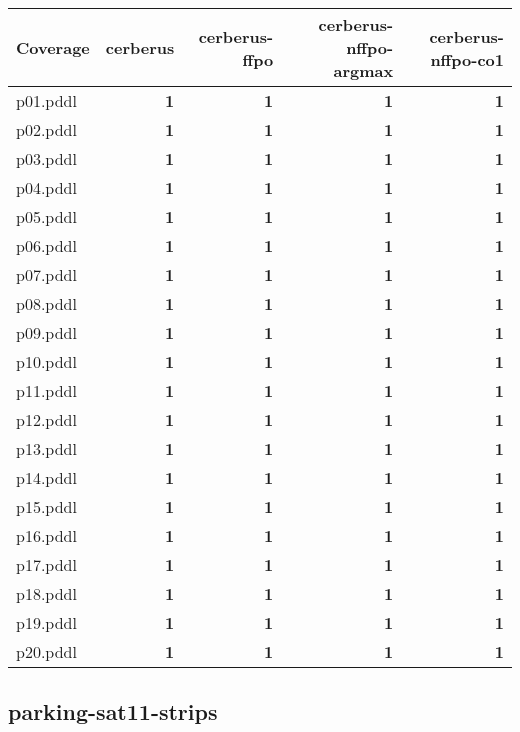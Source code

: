 \documentclass{article}
\begin{document}
\begin{tabular}{@{}lrrrr@{}}
Coverage & cerberus & cerberus-ffpo & cerberus-nffpo-argmax & cerberus-nffpo-co1 \\
\midrule
p01.pddl & \textbf{1} & \textbf{1} & \textbf{1} & \textbf{1} \\
p02.pddl & \textbf{1} & \textbf{1} & \textbf{1} & \textbf{1} \\
p03.pddl & \textbf{1} & \textbf{1} & \textbf{1} & \textbf{1} \\
p04.pddl & \textbf{1} & \textbf{1} & \textbf{1} & \textbf{1} \\
p05.pddl & \textbf{1} & \textbf{1} & \textbf{1} & \textbf{1} \\
p06.pddl & \textbf{1} & \textbf{1} & \textbf{1} & \textbf{1} \\
p07.pddl & \textbf{1} & \textbf{1} & \textbf{1} & \textbf{1} \\
p08.pddl & \textbf{1} & \textbf{1} & \textbf{1} & \textbf{1} \\
p09.pddl & \textbf{1} & \textbf{1} & \textbf{1} & \textbf{1} \\
p10.pddl & \textbf{1} & \textbf{1} & \textbf{1} & \textbf{1} \\
p11.pddl & \textbf{1} & \textbf{1} & \textbf{1} & \textbf{1} \\
p12.pddl & \textbf{1} & \textbf{1} & \textbf{1} & \textbf{1} \\
p13.pddl & \textbf{1} & \textbf{1} & \textbf{1} & \textbf{1} \\
p14.pddl & \textbf{1} & \textbf{1} & \textbf{1} & \textbf{1} \\
p15.pddl & \textbf{1} & \textbf{1} & \textbf{1} & \textbf{1} \\
p16.pddl & \textbf{1} & \textbf{1} & \textbf{1} & \textbf{1} \\
p17.pddl & \textbf{1} & \textbf{1} & \textbf{1} & \textbf{1} \\
p18.pddl & \textbf{1} & \textbf{1} & \textbf{1} & \textbf{1} \\
p19.pddl & \textbf{1} & \textbf{1} & \textbf{1} & \textbf{1} \\
p20.pddl & \textbf{1} & \textbf{1} & \textbf{1} & \textbf{1} \\
\end{tabular}

\hypertarget{coverage-parking-sat11-strips}{}
\subsection*{parking-sat11-strips}
\end{document}
